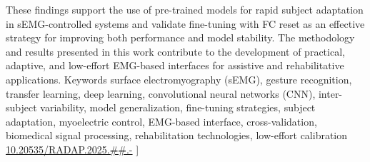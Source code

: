 \begin{multicols}{2}
{These findings support the use of pre-trained models for rapid subject adaptation in sEMG-controlled systems and validate fine-tuning with FC reset as an effective strategy for improving both performance and model stability. The methodology and results presented in this work contribute to the development of practical, adaptive, and low-effort EMG-based interfaces for assistive and rehabilitative applications.
}
{Keywords}{
surface electromyography (sEMG), gesture recognition, transfer learning, deep learning, convolutional neural networks (CNN), inter-subject variability, model generalization, fine-tuning strategies, subject adaptation, myoelectric control, EMG-based interface, cross-validation, biomedical signal processing, rehabilitation technologies, low-effort calibration
 }
{\href{http://radap.kpi.ua/radiotechnique/article/view/20NN}{10.20535/RADAP.2025.\#\#.\pageref{radap20NN:FirstPage}-\pageref{radap20NN:LastPage}}}
]

  


\end{multicols}
